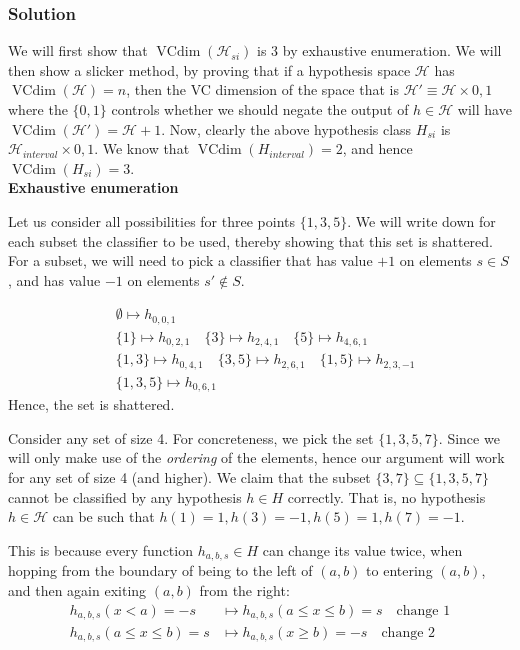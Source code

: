 \documentclass[11pt]{article}
\renewcommand{\H}{\ensuremath{\mathcal{H}}}
\DeclareMathOperator{\vcdim}{VCdim}
\newcommand{\vc}{\ensuremath{\vcdim}}
\begin{document}
\subsubsection*{Solution}

We will first show that $\vc(\H_{si})$ is 3 by exhaustive enumeration. We will
then show a slicker method, by proving that if a hypothesis space $\H$
has $\vcdim(\H) = n$, then the VC dimension of the space that is $\H' \equiv \H \times {0, 1}$
where the $\{0, 1\}$ controls whether we should negate the output of $h \in \H$
will have $\vcdim(\H') = \H+1$. Now, clearly the above hypothesis class $H_{si}$
is $\H_{interval} \times{0, 1}$. We know that $\vc(H_{interval}) = 2$, and
hence $\vc(H_{si}) = 3$. \\

\textbf{Exhaustive enumeration}

Let us consider all possibilities for three points $\{ 1, 3, 5 \}$. We will 
write down for each subset the classifier to be used, thereby showing that
this set is shattered. For a subset, we will need to pick a classifier that
has value $+1$ on elements $s \in S$, and has value $-1$ on elements $s' \not \in S$.

\begin{align*}
    &\emptyset \mapsto h_{0, 0, 1} \\
    &\{ 1 \} \mapsto h_{0, 2, 1} \quad
    \{ 3 \} \mapsto h_{2, 4, 1} \quad
    \{ 5 \} \mapsto h_{4, 6, 1} \\
    &\{ 1, 3 \} \mapsto h_{0, 4, 1} \quad
    \{ 3, 5 \} \mapsto h_{2, 6, 1} \quad
    \{ 1, 5 \} \mapsto h_{2, 3, -1} \\
    &\{1, 3, 5\} \mapsto h_{0, 6, 1}
\end{align*}
Hence, the set is shattered.

Consider any set of size 4. For concreteness, we pick the set $\{1, 3, 5, 7\}$.
Since we will only make use of the \emph{ordering} of the elements, hence our argument
will work for any set of size 4 (and higher).
We claim that the subset $\{3, 7\} \subseteq \{1, 3, 5, 7\}$ cannot be classified
by any hypothesis $h \in H$ correctly. That is,  no hypothesis $h \in \H$ can
be such that  $h(1) = 1, h(3) = -1, h(5) = 1, h(7) = -1$.

This is because every function $h_{a, b, s} \in H$ can change its value twice, when
hopping from the boundary of being to the left of $(a, b)$ to entering $(a, b)$,
and then again exiting $(a, b)$ from the right:
\begin{align*}
h_{a, b, s}(x < a) = -s  &\mapsto h_{a, b, s}(a \leq x \leq b) = s \quad \text{change 1} \\
h_{a, b, s}(a \leq x \leq b) = s &\mapsto h_{a, b, s}(x \geq b) = -s \quad \text{change 2}
\end{align*}
\end{document}
